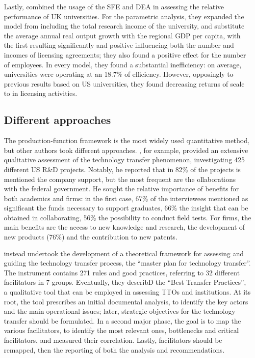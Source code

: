Lastly, \citet{Chapple2005} combined the usage of the SFE and DEA in assessing the relative performance of UK universities. For the parametric analysis, they expanded the model from \citet{Siegel2003a} including the total research income of the university, and substitute the average annual real output growth with the regional GDP per capita, with the first resulting significantly and positive influencing both the number and incomes of licensing agreements; they also found a positive effect for the number of employees. In every model, they found a substantial inefficiency: on average, universities were operating at an 18.7\% of efficiency. However, opposingly to previous results based on US universities, they found decreasing returns of scale to in licensing activities.

\subsection{Different approaches}

The production-function framework is the most widely used quantitative method, but other authors took different approaches. \citet{Lee2000}, for example, provided an extensive qualitative assessment of the technology transfer phenomenon, investigating 425 different US R\&D projects. Notably, he reported that in 82\% of the projects is mentioned the company support, but the most frequent are the ollaborations with the federal government. He sought the relative importance of benefits for both academics and firms: in the first case, 67\% of the interviewees mentioned as significant the funds necessary to support graduates, 66\% the insight that can be obtained in collaborating, 56\% the possibility to conduct field tests. For firms, the main benefits are the access to new knowledge and research, the development of new products (76\%) and the contribution to new patents.

\citet{Resende2013} instead undertook the development of a theoretical framework for assessing and guiding the technology transfer process, the \enquote{master plan for technology transfer}. The instrument contains 271 rules and good practices, referring to 32 different facilitators in 7 groups. Eventually, they describD the \enquote{Best Transfer Practices}, a qualitative tool that can be employed in assessing TTOs and institutions. At its root, the tool prescribes an initial documental analysis, to identify the key actors and the main operational issues; later, strategic objectives for the technology transfer should be formulated. In a second major phase, the goal is to map the various facilitators, to identify the most relevant ones, bottlenecks and critical facilitators, and measured their correlation. Lastly, facilitators should be remapped, then the reporting of both the analysis and recommendations. 

